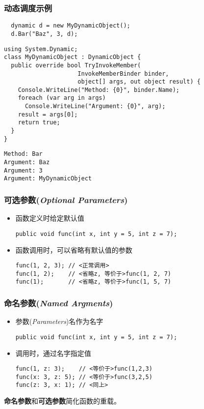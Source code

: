 \begin{frame}
\frametitle{动态调度示例}
\begin{lstlisting}
  dynamic d = new MyDynamicObject();
  d.Bar("Baz", 3, d);
\end{lstlisting}

\begin{lstlisting}
using System.Dynamic;
class MyDynamicObject : DynamicObject {
  public override bool TryInvokeMember(
                     InvokeMemberBinder binder,
                     object[] args, out object result) {
    Console.WriteLine("Method: {0}", binder.Name);
    foreach (var arg in args)
      Console.WriteLine("Argument: {0}", arg);
    result = args[0];
    return true;
  }
}
\end{lstlisting}

\begin{lstlisting}[language=Clean]
Method: Bar
Argument: Baz
Argument: 3
Argument: MyDynamicObject
\end{lstlisting}
\end{frame}


\begin{frame}[fragile]
\frametitle{可选参数(\textit{Optional Parameters})}
\begin{itemize}
\item 函数定义时给定默认值
\begin{lstlisting}
public void func(int x, int y = 5, int z = 7);
\end{lstlisting}
\item 函数调用时，可以省略有默认值的参数
\begin{lstlisting}[escapeinside=<>]
func(1, 2, 3); // <正常调用>
func(1, 2);    // <省略z, 等价于>func(1, 2, 7)
func(1);       // <省略z, 等价于>func(1, 5, 7)
\end{lstlisting}
\end{itemize}
\end{frame}

\begin{frame}[fragile]
\frametitle{命名参数(\textit{Named Argments})}
\begin{itemize}
\item 参数(\textit{Parameters})名作为名字
\begin{lstlisting}
public void func(int x, int y = 5, int z = 7);
\end{lstlisting}
\item 调用时，通过名字指定值
\begin{lstlisting}[escapeinside=<>]
func(1, z: 3);    // <等价于>func(1,2,3)
func(x: 3, z: 5); // <等价于>func(3,2,5)
func(z: 3, x: 1); // <同上>
\end{lstlisting}
\end{itemize}
\textbf{命名参数}和\textbf{可选参数}简化函数的重载。
\end{frame}

